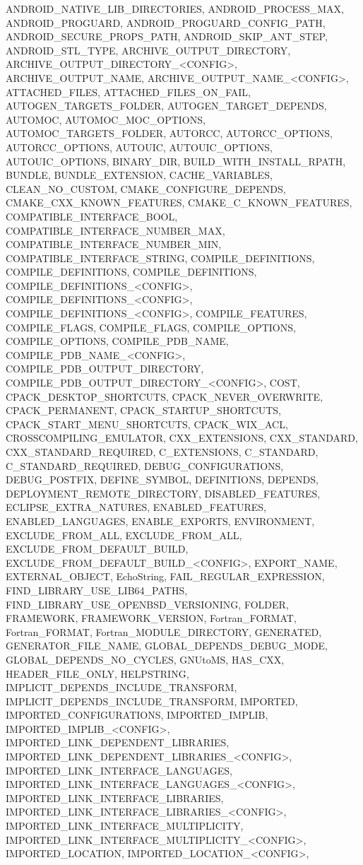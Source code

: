 {{ANDROID_NATIVE_LIB_DIRECTORIES,
ANDROID_PROCESS_MAX,
ANDROID_PROGUARD,
ANDROID_PROGUARD_CONFIG_PATH,
ANDROID_SECURE_PROPS_PATH,
ANDROID_SKIP_ANT_STEP,
ANDROID_STL_TYPE,
ARCHIVE_OUTPUT_DIRECTORY,
ARCHIVE_OUTPUT_DIRECTORY_<CONFIG>,
ARCHIVE_OUTPUT_NAME,
ARCHIVE_OUTPUT_NAME_<CONFIG>,
ATTACHED_FILES,
ATTACHED_FILES_ON_FAIL,
AUTOGEN_TARGETS_FOLDER,
AUTOGEN_TARGET_DEPENDS,
AUTOMOC,
AUTOMOC_MOC_OPTIONS,
AUTOMOC_TARGETS_FOLDER,
AUTORCC,
AUTORCC_OPTIONS,
AUTORCC_OPTIONS,
AUTOUIC,
AUTOUIC_OPTIONS,
AUTOUIC_OPTIONS,
BINARY_DIR,
BUILD_WITH_INSTALL_RPATH,
BUNDLE,
BUNDLE_EXTENSION,
CACHE_VARIABLES,
CLEAN_NO_CUSTOM,
CMAKE_CONFIGURE_DEPENDS,
CMAKE_CXX_KNOWN_FEATURES,
CMAKE_C_KNOWN_FEATURES,
COMPATIBLE_INTERFACE_BOOL,
COMPATIBLE_INTERFACE_NUMBER_MAX,
COMPATIBLE_INTERFACE_NUMBER_MIN,
COMPATIBLE_INTERFACE_STRING,
COMPILE_DEFINITIONS,
COMPILE_DEFINITIONS,
COMPILE_DEFINITIONS,
COMPILE_DEFINITIONS_<CONFIG>,
COMPILE_DEFINITIONS_<CONFIG>,
COMPILE_DEFINITIONS_<CONFIG>,
COMPILE_FEATURES,
COMPILE_FLAGS,
COMPILE_FLAGS,
COMPILE_OPTIONS,
COMPILE_OPTIONS,
COMPILE_PDB_NAME,
COMPILE_PDB_NAME_<CONFIG>,
COMPILE_PDB_OUTPUT_DIRECTORY,
COMPILE_PDB_OUTPUT_DIRECTORY_<CONFIG>,
COST,
CPACK_DESKTOP_SHORTCUTS,
CPACK_NEVER_OVERWRITE,
CPACK_PERMANENT,
CPACK_STARTUP_SHORTCUTS,
CPACK_START_MENU_SHORTCUTS,
CPACK_WIX_ACL,
CROSSCOMPILING_EMULATOR,
CXX_EXTENSIONS,
CXX_STANDARD,
CXX_STANDARD_REQUIRED,
C_EXTENSIONS,
C_STANDARD,
C_STANDARD_REQUIRED,
DEBUG_CONFIGURATIONS,
DEBUG_POSTFIX,
DEFINE_SYMBOL,
DEFINITIONS,
DEPENDS,
DEPLOYMENT_REMOTE_DIRECTORY,
DISABLED_FEATURES,
ECLIPSE_EXTRA_NATURES,
ENABLED_FEATURES,
ENABLED_LANGUAGES,
ENABLE_EXPORTS,
ENVIRONMENT,
EXCLUDE_FROM_ALL,
EXCLUDE_FROM_ALL,
EXCLUDE_FROM_DEFAULT_BUILD,
EXCLUDE_FROM_DEFAULT_BUILD_<CONFIG>,
EXPORT_NAME,
EXTERNAL_OBJECT,
EchoString,
FAIL_REGULAR_EXPRESSION,
FIND_LIBRARY_USE_LIB64_PATHS,
FIND_LIBRARY_USE_OPENBSD_VERSIONING,
FOLDER,
FRAMEWORK,
FRAMEWORK_VERSION,
Fortran_FORMAT,
Fortran_FORMAT,
Fortran_MODULE_DIRECTORY,
GENERATED,
GENERATOR_FILE_NAME,
GLOBAL_DEPENDS_DEBUG_MODE,
GLOBAL_DEPENDS_NO_CYCLES,
GNUtoMS,
HAS_CXX,
HEADER_FILE_ONLY,
HELPSTRING,
IMPLICIT_DEPENDS_INCLUDE_TRANSFORM,
IMPLICIT_DEPENDS_INCLUDE_TRANSFORM,
IMPORTED,
IMPORTED_CONFIGURATIONS,
IMPORTED_IMPLIB,
IMPORTED_IMPLIB_<CONFIG>,
IMPORTED_LINK_DEPENDENT_LIBRARIES,
IMPORTED_LINK_DEPENDENT_LIBRARIES_<CONFIG>,
IMPORTED_LINK_INTERFACE_LANGUAGES,
IMPORTED_LINK_INTERFACE_LANGUAGES_<CONFIG>,
IMPORTED_LINK_INTERFACE_LIBRARIES,
IMPORTED_LINK_INTERFACE_LIBRARIES_<CONFIG>,
IMPORTED_LINK_INTERFACE_MULTIPLICITY,
IMPORTED_LINK_INTERFACE_MULTIPLICITY_<CONFIG>,
IMPORTED_LOCATION,
IMPORTED_LOCATION_<CONFIG>,
}}
